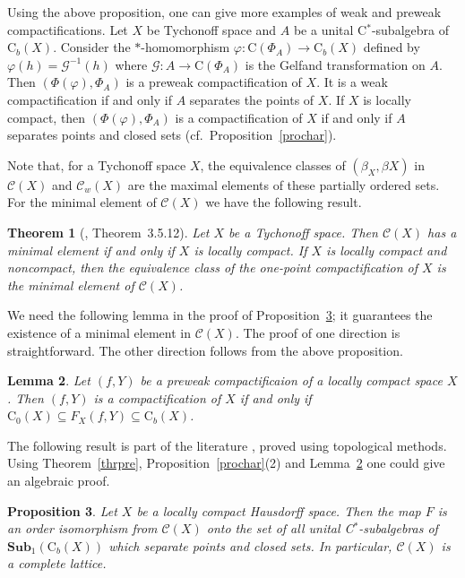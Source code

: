 \documentclass[manuscript]{amsart}
\newtheorem{theorem}{Theorem}[section]
\newtheorem{lemma}[theorem]{Lemma}
\newtheorem{proposition}[theorem]{Proposition}
\theoremstyle{definition}
\begin{document}
Using the above proposition, one can give more examples of weak and preweak  compactifications.
Let $X$ be Tychonoff space and $A$ be a unital C$^*$-subalgebra of $\mathrm{C}_{b}(X)$.
Consider the $*$-homomorphism
$\varphi : \mathrm{C}(\Phi_{A})\to \mathrm{C}_{b}(X)$ defined by $\varphi(h)=\mathcal{G}^{-1}(h)$ where
$\mathcal{G}:A\to \mathrm{C}(\Phi_{A})$ is the Gelfand transformation on $A$. Then $(\Phi(\varphi), \Phi_{A})$
is a preweak compactification of $X$. It is a   weak compactification if and only if $A$
separates the points of $X$. If $X$ is locally compact, then $(\Phi(\varphi), \Phi_{A})$
is a compactification of $X$ if and only if $A$ separates points and closed sets
 (cf.~Proposition~\ref{prochar}).

Note that, for a Tychonoff space $X$, the equivalence classes of $(\beta_{X},\beta X)$
in $\mathcal{C}(X)$ and $\mathcal{C}_{w}(X)$ are the maximal
elements of these partially ordered sets.
For the minimal element of $\mathcal{C}(X)$ we have
the following result.

\begin{theorem}[\cite{en89}, Theorem~3.5.12]
Let $X$ be a Tychonoff space. Then $\mathcal{C}(X)$ has a minimal
element if and only if $X$ is locally compact.
If $X$ is  locally compact and noncompact,
then the equivalence class of the one-point compactification of $X$
is the minimal element of $\mathcal{C}(X)$.
\end{theorem}

We  need the following
lemma  in the proof of Proposition~\ref{propcomp}; it
guarantees the existence of
a minimal element in $\mathcal{C}(X)$. The proof of one direction is straightforward. The other direction follows from the above proposition.  
\begin{lemma}\label{lemmin}
Let $(f,Y)$ be a preweak compactificaion of a locally compact space $X$. Then
$(f,Y)$ is a compactification of $X$ if and only if
 $\mathrm{C}_{0}(X)\subseteq F_{X}(f,Y)\subseteq \mathrm{C}_{b}(X)$.
\end{lemma}

The following result is part of the literature
\cite[Theorems~3.5.9 and 3.5.12]{en89}, proved using topological methods.
Using Theorem~\ref{thrpre}, Proposition~\ref{prochar}(2) and 
Lemma~\ref{lemmin} one could give an algebraic proof.

\begin{proposition}\label{propcomp}
Let $X$ be a locally compact Hausdorff space.
Then the map $F$ is an order isomorphism from
$\mathcal{C}(X)$ onto the set of all unital C$^*$-subalgebras of
$\mathbf{Sub}_{1}(\mathrm{C}_{b}(X))$  which
separate  points and closed sets.
In particular, $\mathcal{C}(X)$ is a complete lattice.
\end{proposition}
\end{document}
